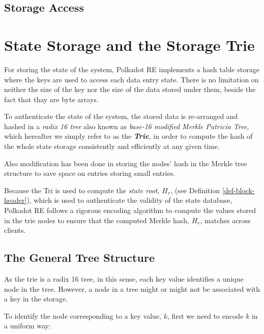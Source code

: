 \documentclass{article}
\newcommand{\tmem}[1]{{\em #1\/}}
\newcommand{\tmstrong}[1]{\textbf{#1}}
\newcommand{\tmtextbf}[1]{{\bfseries{#1}}}
\newcommand{\tmtextit}[1]{{\itshape{#1}}}
\providecommand{\tmem}[1]{\tmtextit{#1}}
\providecommand{\tmstrong}[1]{\tmtextbf{#1}}
\providecommand{\tmtextbf}[1]{\tmtextbf{#1}}
\providecommand{\tmtextit}[1]{\tmtextit{#1}}
\begin{document}
\subsection{Storage Access}

\section{State Storage and the Storage Trie}

For storing the state of the system, Polkadot RE implements a hash table
storage where the keys are used to access each data entry state. There is no
limitation on neither the size of the key nor the size of the data stored
under them, beside the fact that thay are byte arrays.

To authenticate the state of the system, the stored data is re-arranged and
hashed in a {\tmem{radix 16 tree}} also known as {\tmem{base-16 modified
Merkle Patricia Tree}}, which hereafter we simply refer to as the
{\tmem{{\tmstrong{Trie}},}} in order to compute the hash of the whole state
storage consistently and efficiently at any given time.

Also modification has been done in storing the nodes' hash in the Merkle tree
structure to save space on entries storing small entries.

Because the Tri is used to compute the {\tmem{state root}}, $H_r$, (see
Definition \ref{def-block-header}), which is used to authenticate the validity
of the state database, Polkadot RE follows a rigorous encoding algorithm to
compute the values stored in the trie nodes to ensure that the computed Merkle
hash, $H_r$, matches across clients.

\subsection{The General Tree Structure}

As the trie is a radix 16 tree, in this sense, each key value identifies a
unique node in the tree. However, a node in a tree might or might not be
associated with a key in the storage.

To identify the node corresponding to a key value, $k$, first we need to
encode $k$ in a uniform way:
\end{document}
